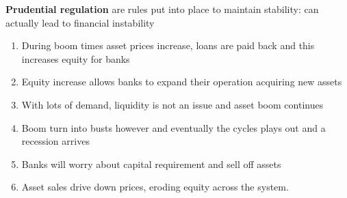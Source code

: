 \documentclass{beamer}
\begin{document}
\begin{frame}
 \textbf{Prudential regulation} are rules put into place to maintain stability: can actually lead to financial instability
  \begin{enumerate}
  \item During boom times asset prices increase, loans are paid back and this increases equity for banks 
  \item Equity increase allows banks to expand their operation acquiring new assets
  \item With lots of demand, liquidity is not an issue and asset boom continues
  \item Boom turn into busts however and eventually the cycles plays out and a recession arrives
  \item Banks will worry about capital requirement and sell off assets
  \item Asset sales drive down prices, eroding equity across the system.
\end{enumerate}
\end{frame}





\end{document}
